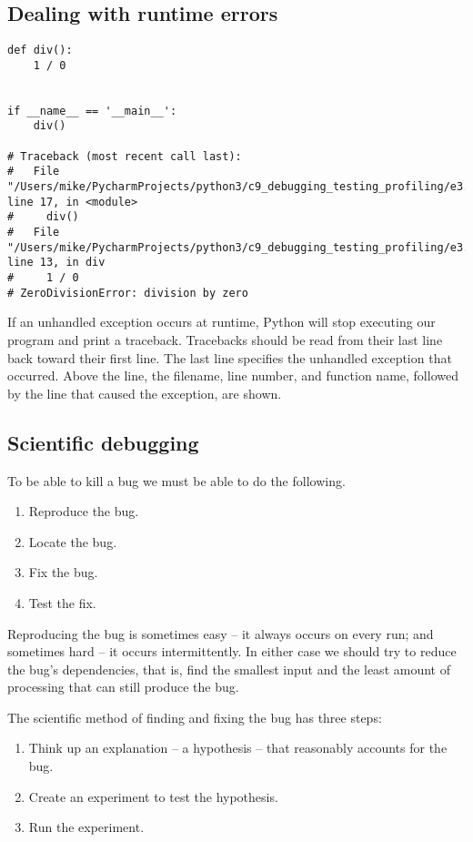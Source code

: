 \subsection{Dealing with runtime errors}

\begin{lstlisting}
def div():
    1 / 0


if __name__ == '__main__':
    div()

# Traceback (most recent call last):
#   File "/Users/mike/PycharmProjects/python3/c9_debugging_testing_profiling/e3.py", line 17, in <module>
#     div()
#   File "/Users/mike/PycharmProjects/python3/c9_debugging_testing_profiling/e3.py", line 13, in div
#     1 / 0
# ZeroDivisionError: division by zero  
\end{lstlisting}

If an unhandled exception occurs at runtime, Python will stop executing our program and print a traceback.
Tracebacks should be read from their last line back toward their first line.
The last line specifies the unhandled exception that occurred.
Above the line, the filename, line number, and function name, followed by the line that caused the exception, are shown.


\subsection{Scientific debugging}

To be able to kill a bug we must be able to do the following.
\begin{enumerate}
\item Reproduce the bug.
\item Locate the bug.
\item Fix the bug.
\item Test the fix.
\end{enumerate}


Reproducing the bug is sometimes easy -- it always occurs on every run; and sometimes hard -- it occurs intermittently.
In either case we should try to reduce the bug’s dependencies, that is, find the smallest input and the least amount of processing that can still produce the bug.


The scientific method of finding and fixing the bug has three steps:
\begin{enumerate}
\item Think up an explanation -- a hypothesis -- that reasonably accounts for the bug.
\item Create an experiment to test the hypothesis.
\item Run the experiment.
\end{enumerate}


